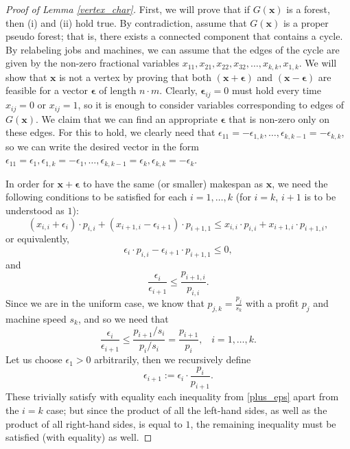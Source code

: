 \documentclass[a4paper,UKenglish,cleveref, autoref, thm-restate, pdfa]{lipics-v2021}
\theoremstyle{plain}
\begin{document}
\begin{proof}[Proof of Lemma \ref{vertex_char}]
    First, we will prove that if $G(\bm{x})$ is a forest, then (i) and (ii) hold true. 
By contradiction, assume that $G(\bm{x})$ is a proper pseudo forest; that is, there exists a connected component that contains a cycle. By relabeling jobs and machines, we can assume that the edges of the cycle are given by the non-zero fractional variables $x_{11}, x_{21}, x_{22}, x_{32}, \ldots, x_{k,k}, x_{1,k}$. We will show that $\bm{x}$ is not a vertex by proving that both $(\bm{x} + \bm{\epsilon})$ and $(\bm{x} - \bm{\epsilon})$ are feasible for a vector $\bm{\epsilon}$ of length $n\cdot m$. Clearly, $\bm{\epsilon}_{ij} = 0$ must hold every time $x_{ij} = 0$ or $x_{ij}=1$, so it is enough to consider variables corresponding to edges of $G(\bm{x})$. We claim that we can find an appropriate $\bm{\epsilon}$ that is non-zero only on these edges. For this to hold, we clearly need that $\epsilon_{11} = - \epsilon_{1,k}, \ldots, \epsilon_{k,k-1} = - \epsilon_{k,k}$, so we can write the desired vector in the form $\epsilon_{11} = \epsilon_1, \epsilon_{1,k} = -\epsilon_1, \ldots, \epsilon_{k,k-1} = \epsilon_k, \epsilon_{k,k} = - \epsilon_k$.

    In order for $\bm{x} + \bm{\epsilon}$ to have the same (or smaller) makespan as $\bm{x}$, we need the following conditions to be satisfied for each $i=1,\ldots,k$ (for $i=k$, $i+1$ is to be understood as $1$):
    \[
    (x_{i,i} + \epsilon_i)\cdot p_{i,i} + (x_{i+1,i}- \epsilon_{i+1})\cdot p_{i+1,1} \le x_{i,i}\cdot p_{i,i} + x_{i+1,i}\cdot p_{i+1,i},
    \]
    or equivalently,
    \[
    \epsilon_i \cdot p_{i,i} - \epsilon_{i+1}\cdot p_{i+1,1} \le 0,
    \]
    and
    \[
    \frac{\epsilon_i}{\epsilon_{i+1}} \le \frac{p_{i+1,i}}{p_{i,i}}. 
    \]
    Since we are in the uniform case, we know that $p_{j,k} = \frac{p_j}{s_k}$ with a profit $p_j$ and machine speed $s_k$, and so we need that 
    \begin{equation}\label{plus_eps}
        \frac{\epsilon_i}{\epsilon_{i+1}} \le \frac{p_{i+1}/s_i}{p_i/s_i} = \frac{p_{i+1}}{p_i}, \,\,\,\,\, i = 1, \ldots, k.
    \end{equation}
    Let us choose $\epsilon_1 > 0$ arbitrarily, then we recursively define 
    \[
    \epsilon_{i+1} := \epsilon_i \cdot \frac{p_i}{p_{i+1}}.
    \]
    These trivially satisfy with equality each inequality from \eqref{plus_eps} apart from the $i=k$ case; but since the product of all the left-hand sides, as well as the product of all right-hand sides, is equal to $1$, the remaining inequality must be satisfied (with equality) as well.


\end{proof}
\end{document}
